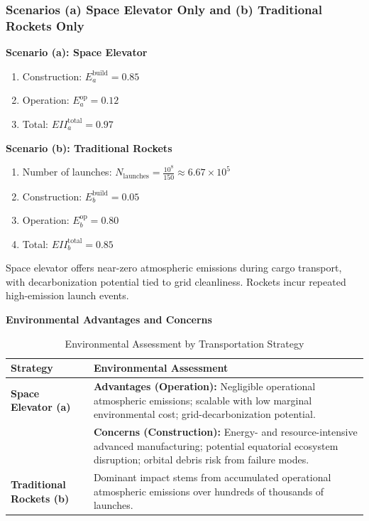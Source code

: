 \documentclass[12pt]{mcmthesis}
\begin{document}
\subsubsection{Scenarios (a) Space Elevator Only and (b) Traditional Rockets Only}

\textbf{Scenario (a): Space Elevator}
\begin{enumerate}
    \item Construction: $E_a^{\text{build}} = 0.85$
    \item Operation: $E_a^{\text{op}} = 0.12$
    \item Total: $EII_a^{\text{total}} = 0.97$
\end{enumerate}

\textbf{Scenario (b): Traditional Rockets}
\begin{enumerate}
    \item Number of launches: $N_{\text{launches}} = \frac{10^8}{150} \approx 6.67\times 10^5$
    \item Construction: $E_b^{\text{build}} = 0.05$
    \item Operation: $E_b^{\text{op}} = 0.80$
    \item Total: $EII_b^{\text{total}} = 0.85$
\end{enumerate}

Space elevator offers near-zero atmospheric emissions during cargo transport, with decarbonization potential tied to grid cleanliness. Rockets incur repeated high-emission launch events.

\textbf{Environmental Advantages and Concerns}

\begin{table}[htbp]
    \centering
    \caption{Environmental Assessment by Transportation Strategy}
    \label{tab:strategy_assessment}
    \begin{tabular}{p{} p{}}
        \toprule
        \textbf{Strategy}                & \textbf{Environmental Assessment}                                                                                                                                           \\
        \midrule
        \textbf{Space Elevator (a)}      &
        \textbf{Advantages (Operation):} Negligible operational atmospheric emissions; scalable with low marginal environmental cost; grid-decarbonization potential.                                                  \\
                                         & \textbf{Concerns (Construction):} Energy- and resource-intensive advanced manufacturing; potential equatorial ecosystem disruption; orbital debris risk from failure modes. \\
        \midrule
        \textbf{Traditional Rockets (b)} &
        Dominant impact stems from accumulated operational atmospheric emissions over hundreds of thousands of launches.                                                                                               \\
        \bottomrule
    \end{tabular}
\end{table}
\end{document}

